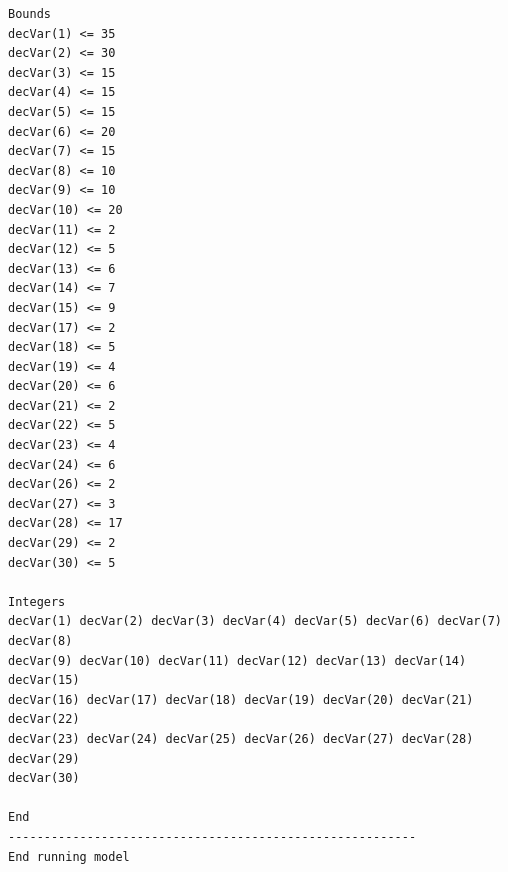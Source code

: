 \documentclass[paper=a4, fontsize=11pt]{scrartcl} %
\begin{document}
\begin{verbatim}
Bounds
decVar(1) <= 35
decVar(2) <= 30
decVar(3) <= 15
decVar(4) <= 15
decVar(5) <= 15
decVar(6) <= 20
decVar(7) <= 15
decVar(8) <= 10
decVar(9) <= 10
decVar(10) <= 20
decVar(11) <= 2
decVar(12) <= 5
decVar(13) <= 6
decVar(14) <= 7
decVar(15) <= 9
decVar(17) <= 2
decVar(18) <= 5
decVar(19) <= 4
decVar(20) <= 6
decVar(21) <= 2
decVar(22) <= 5
decVar(23) <= 4
decVar(24) <= 6
decVar(26) <= 2
decVar(27) <= 3
decVar(28) <= 17
decVar(29) <= 2
decVar(30) <= 5

Integers
decVar(1) decVar(2) decVar(3) decVar(4) decVar(5) decVar(6) decVar(7) decVar(8) 
decVar(9) decVar(10) decVar(11) decVar(12) decVar(13) decVar(14) decVar(15) 
decVar(16) decVar(17) decVar(18) decVar(19) decVar(20) decVar(21) decVar(22) 
decVar(23) decVar(24) decVar(25) decVar(26) decVar(27) decVar(28) decVar(29) 
decVar(30) 

End
---------------------------------------------------------
End running model

\end{verbatim}

\end{document}
